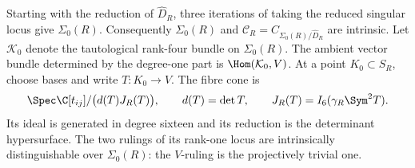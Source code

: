 \begin{lemma}
\label{lem:deepest-normal-cone}
Starting with the reduction of \(\widehat D_R\), three iterations
of taking the reduced singular locus give \(\Sigma_0(R)\).
Consequently \(\Sigma_0(R)\) and
\(\mathscr C_R=C_{\Sigma_0(R)/\widehat D_R}\) are intrinsic.
Let \(\mathcal K_0\) denote the tautological rank-four bundle on
\(\Sigma_0(R)\).  The ambient vector bundle determined by the degree-one part is
\(\Hom(\mathcal K_0,V)\).  At a point \(K_0\subset S_R\),
choose bases and write \(T:K_0\to V\).  The fibre cone is
\begin{equation}\label{eq:deepest-cone-equation}
 \Spec\C[t_{ij}]/\bigl(d(T)J_R(T)\bigr),\qquad
 d(T)=\det T,\qquad J_R(T)=I_6(\gamma_R\Sym^2T).
\end{equation}
Its ideal is generated in degree sixteen and its reduction is the
determinant hypersurface.  The two rulings of its rank-one locus
are intrinsically distinguishable over \(\Sigma_0(R)\): the
\(V\)-ruling is the projectively trivial one.
\end{lemma}
